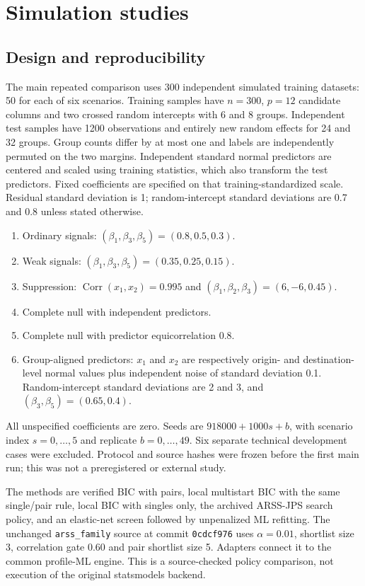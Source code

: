 \documentclass[preprint,11pt,numbers]{elsarticle}
\theoremstyle{remark}\newtheorem{remark}[theorem]{Remark}
\begin{document}
\section{Simulation studies}
\subsection{Design and reproducibility}\label{sec:researchworkflow}
The main repeated comparison uses 300 independent simulated training datasets:
50 for each of six scenarios. Training samples have $n=300$, $p=12$ candidate
columns and two crossed random intercepts with 6 and 8 groups. Independent test
samples have 1200 observations and entirely new random effects for 24 and 32
groups. Group counts differ by at most one and labels are independently
permuted on the two margins. Independent standard normal predictors are
centered and scaled using training statistics, which also transform the test
predictors. Fixed coefficients are specified on that training-standardized scale.
Residual standard deviation is 1; random-intercept standard deviations are
0.7 and 0.8 unless stated otherwise.

\begin{enumerate}
\item Ordinary signals: $(\beta_1,\beta_3,\beta_5)=(0.8,0.5,0.3)$.
\item Weak signals: $(\beta_1,\beta_3,\beta_5)=(0.35,0.25,0.15)$.
\item Suppression: $\operatorname{Corr}(x_1,x_2)=0.995$ and
$(\beta_1,\beta_2,\beta_3)=(6,-6,0.45)$.
\item Complete null with independent predictors.
\item Complete null with predictor equicorrelation 0.8.
\item Group-aligned predictors: $x_1$ and $x_2$ are respectively origin- and
destination-level normal values plus independent noise of standard deviation
0.1. Random-intercept standard deviations are 2 and 3, and
$(\beta_3,\beta_5)=(0.65,0.4)$.
\end{enumerate}
All unspecified coefficients are zero. Seeds are $918000+1000s+b$, with
scenario index $s=0,\ldots,5$ and replicate $b=0,\ldots,49$. Six separate
technical development cases were excluded. Protocol and source hashes were
frozen before the first main run; this was not a preregistered or external study.

The methods are verified BIC with pairs, local multistart BIC with the same
single/pair rule, local BIC with singles only, the archived ARSS-JPS search policy,
and an elastic-net screen followed by unpenalized ML refitting. The unchanged
\texttt{arss\_family} source at commit \texttt{0cdcf976} uses
$\alpha=0.01$, shortlist size 3, correlation gate 0.60 and pair shortlist size 5.
Adapters connect it to the common profile-ML engine. This is a source-checked
policy comparison, not execution of the original statsmodels backend.
\end{document}
